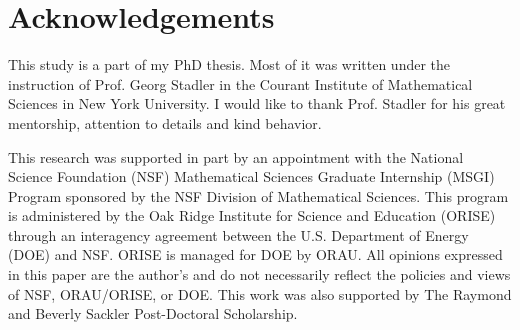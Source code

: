 \documentclass{amsart}
\numberwithin{equation}{section}
\begin{document}



\section{Acknowledgements}
This study is a part of my PhD thesis. Most of it was written under
the instruction of Prof. Georg Stadler in the Courant Institute of
Mathematical Sciences in New York University. I would like to thank
Prof. Stadler for his great mentorship, attention to details and kind
behavior.

This research was supported in part by an appointment with the
National Science Foundation (NSF) Mathematical Sciences Graduate
Internship (MSGI) Program sponsored by the NSF Division of
Mathematical Sciences. This program is administered by the Oak Ridge
Institute for Science and Education (ORISE) through an interagency
agreement between the U.S. Department of Energy (DOE) and NSF. ORISE
is managed for DOE by ORAU. All opinions expressed in this paper are
the author's and do not necessarily reflect the policies and views of
NSF, ORAU/ORISE, or DOE.  This work was also supported by The Raymond
and Beverly Sackler Post-Doctoral Scholarship.





\end{document}
